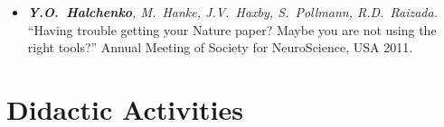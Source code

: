 \documentclass[12pt,overlapped,line]{res}
\newcommand{\mtitle}[1]{``#1''}
\newcommand{\mauthors}[1]{ \textit{#1.}}
\newcommand{\mwhere}[1]{#1.}
\begin{document}
\begin{resume}
\begin{itemize}
 \item
   \mauthors{\textbf{Y.O.~Halchenko}, M.~Hanke, J.V.~Haxby,
     S.~Pollmann, R.D.~Raizada}
   \mtitle{Having trouble getting your Nature paper? Maybe you are not
     using the right tools?}
   \mwhere{Annual Meeting of Society for NeuroScience, USA 2011}

% 
% 

\end{itemize}

\section{Didactic Activities}


\end{resume}
\end{document}
